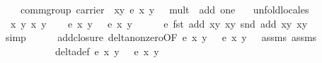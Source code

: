 \begin{isabellebody}
\ \ \ {\isachardoublequoteopen}comm{\isacharunderscore}group\ {\isasymlparr}carrier\ {\isacharequal}\ {\isacharbraceleft}{\isacharparenleft}x{\isacharcomma}y{\isacharparenright}{\isachardot}\ e\ x\ y\ {\isacharequal}\ {}{\isacharbraceright}{\isacharcomma}\ mult\ {\isacharequal}\ add{\isacharcomma}\ one\ {\isacharequal}\ {\isacharparenleft}{}{\isacharcomma}{}{\isacharparenright}{\isasymrparr}{\isachardoublequoteclose}\ \isanewline
%
\isadelimproof
%
\endisadelimproof
%
\isatagproof
{}\isamarkupfalse%
{\isacharparenleft}unfold{\isacharunderscore}locales{\isacharparenright}\isanewline
\ \ \isacommand{{\isacharbraceleft}}\isamarkupfalse%
\isamarkupfalse%
\ x{}\ y{}\ x{}\ y{}\isanewline
\ \ \isamarkupfalse%
\ {\isachardoublequoteopen}e\ x{}\ y{}\ {\isacharequal}\ {}{\isachardoublequoteclose}\ {\isachardoublequoteopen}e\ x{}\ y{}\ {\isacharequal}\ {}{\isachardoublequoteclose}\isanewline
\ \ \isamarkupfalse%
\ {\isachardoublequoteopen}e\ {\isacharparenleft}fst\ {\isacharparenleft}add\ {\isacharparenleft}x{}{\isacharcomma}y{}{\isacharparenright}\ {\isacharparenleft}x{}{\isacharcomma}y{}{\isacharparenright}{\isacharparenright}{\isacharparenright}\ {\isacharparenleft}snd\ {\isacharparenleft}add\ {\isacharparenleft}x{}{\isacharcomma}y{}{\isacharparenright}\ {\isacharparenleft}x{}{\isacharcomma}y{}{\isacharparenright}{\isacharparenright}{\isacharparenright}\ {\isacharequal}\ {}{\isachardoublequoteclose}\isanewline
\ \ \ \ \isamarkupfalse%
{\isacharparenleft}simp{\isacharparenright}\isanewline
\ \ \ \ \isamarkupfalse%
\ add{\isacharunderscore}closure\ delta{\isacharunderscore}non{\isacharunderscore}zero{\isacharbrackleft}OF\ {\isacartoucheopen}e\ x{}\ y{}\ {\isacharequal}\ {}{\isacartoucheclose}\ {\isacartoucheopen}e\ x{}\ y{}\ {\isacharequal}\ {}{\isacartoucheclose}\ assms{\isacharparenleft}{}{\isacharparenright}\ assms{\isacharparenleft}{}{\isacharparenright}{\isacharbrackright}\ \isanewline
\ \ \ \ \ \ \ \ \ \ delta{\isacharunderscore}def\ {\isacartoucheopen}e\ x{}\ y{}\ {\isacharequal}\ {}{\isacartoucheclose}\ {\isacartoucheopen}e\ x{}\ y{}\ {\isacharequal}\ {}{\isacartoucheclose}\ \isamarkupfalse%

\end{isabellebody}
